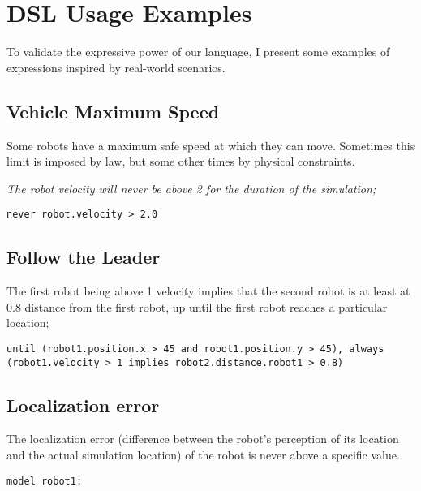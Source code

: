 \section{DSL Usage Examples}
\label{sec:languageexamples}
To validate the expressive power of our language, I present some examples of expressions inspired by real-world scenarios.


\subsection{Vehicle Maximum Speed}
\label{sec:speedexample}

Some robots have a maximum safe speed at which they can move. Sometimes this limit is imposed by law, but some other times by physical constraints.

\textit{The robot velocity will never be above 2 for the duration of the simulation;}

\texttt{never robot.velocity > 2.0}


\subsection{Follow the Leader}
\label{ssec:followexample}

The first robot being above 1 velocity implies that the second robot is at least at 0.8 distance from the first robot, up until the first robot reaches a particular location;

\texttt{until (robot1.position.x > 45 and robot1.position.y > 45), always (robot1.velocity > 1 implies robot2.distance.robot1 > 0.8)}


\subsection{Localization error}
\label{ssec:localizationexample}

The localization error (difference between the robot's perception of its location and the actual simulation location) of the robot is never above a specific value.

\texttt{model robot1:}

